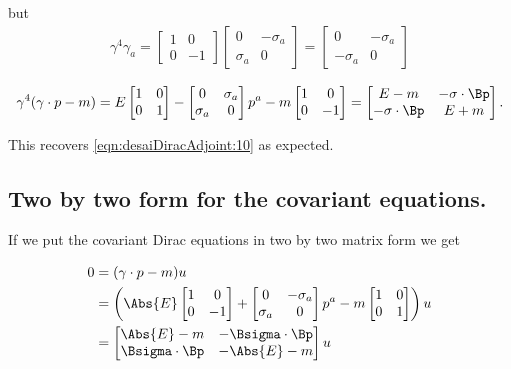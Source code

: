 but
\begin{align*}
\gamma^4 \gamma_a 
=
\begin{bmatrix}
1 & 0 \\
0 & -1 
\end{bmatrix}
\begin{bmatrix}
0 & -\sigma_a \\
\sigma_a & 0 
\end{bmatrix}
=
\begin{bmatrix}
0 & -\sigma_a \\
-\sigma_a & 0 
\end{bmatrix}
\end{align*}

\begin{equation}\label{eqn:desaiDiracAdjoint:400}
\gamma^4 (\gamma \cdot p - m)
=
E
\begin{bmatrix}
1 & 0 \\
0 & 1 
\end{bmatrix}
 - 
\begin{bmatrix}
0 & \sigma_a \\
\sigma_a & 0 
\end{bmatrix}
p^a - m 
\begin{bmatrix}
1 & 0 \\
0 & -1 
\end{bmatrix} =
\begin{bmatrix}
E - m & - \sigma \cdot \Bp \\
- \sigma \cdot \Bp & E + m
\end{bmatrix}.
\end{equation}

This recovers \ref{eqn:desaiDiracAdjoint:10} as expected.

\subsection{Two by two form for the covariant equations.}

If we put the covariant Dirac equations in two by two matrix form we get

\begin{align*}
0
&= 
(\gamma \cdot p - m ) u \\
&= 
\left(
\Abs{E} 
\begin{bmatrix}
1 & 0 \\
0 & -1 
\end{bmatrix}
+ 
\begin{bmatrix}
0 & - \sigma_a \\
\sigma_a & 0
\end{bmatrix}
p^a
- m
\begin{bmatrix}
1 & 0 \\
0 & 1 
\end{bmatrix}
\right) u \\
&=
\begin{bmatrix}
\Abs{E} - m & - \Bsigma \cdot \Bp \\
\Bsigma \cdot \Bp & -\Abs{E} - m
\end{bmatrix} u
\end{align*}

